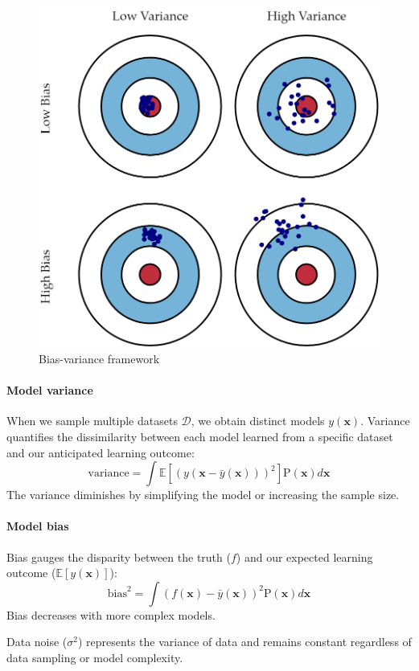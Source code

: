 \begin{figure}[H]
    \centering
    \includegraphics[width=0.5\linewidth]{images/bvf.png}
    \caption{Bias-variance framework}
\end{figure}

\paragraph*{Model variance}
When we sample multiple datasets $\mathcal{D}$, we obtain distinct models $y(\textbf{x})$. 
Variance quantifies the dissimilarity between each model learned from a specific dataset and our anticipated learning outcome:
\[\text{variance}=\int \mathbb{E}\left[ {\left( y(\textbf{x}-\bar{y}(\textbf{x})) \right)}^2 \right]\text{P}(\textbf{x})d\textbf{x}\]
The variance diminishes by simplifying the model or increasing the sample size.

\paragraph*{Model bias}
Bias gauges the disparity between the truth ($f$) and our expected learning outcome ($\mathbb{E}\left[y(\textbf{x})\right]$):
\[\text{bias}^2=\int {\left(f(\textbf{x})-\bar{y}(\textbf{x})\right)}^2 \text{P}(\textbf{x})d\textbf{x}\]
Bias decreases with more complex models.
\begin{definition}
    Data noise ($\sigma^2$) represents the variance of data and remains constant regardless of data sampling or model complexity.
\end{definition}

